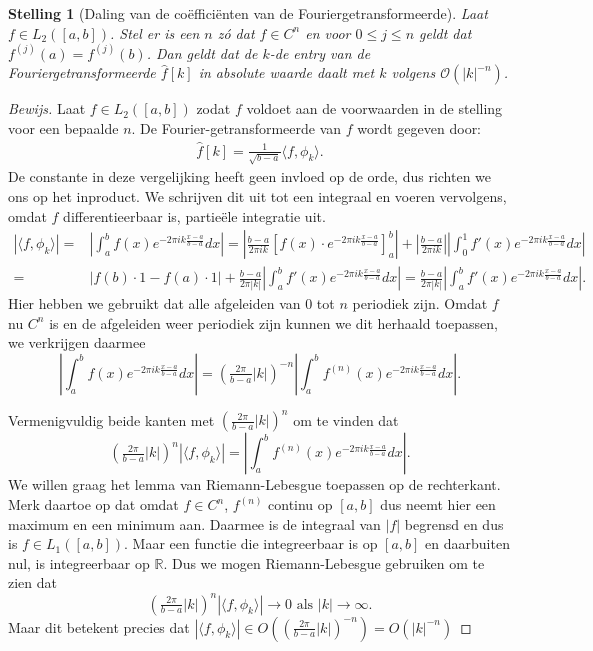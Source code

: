 \documentclass[11pt]{report}
\newcommand{\R}{\mathbb{R}}
\renewcommand{\O}{\mathcal{O}}
\theoremstyle{plain}
\newtheorem*{stelling}{Stelling}
\theoremstyle{remark}
\newcommand{\eq}[1]{\begin{eqnarray*} #1 \end{eqnarray*}}
\newcommand{\inpr}[2]{\langle #1 , #2 \rangle}
\newcommand{\abso}[1]{{\left| #1 \right|}}
\begin{document}
\begin{stelling}[Daling van de co\"effici\"enten van de Fouriergetransformeerde]
  Laat $f \in L_2([a,b])$. Stel er is een $n$ z\'o dat $f \in C^n$ en voor $0\leq j\leq n$ geldt dat $f^{(j)}(a) = f^{(j)}(b)$. Dan geldt dat de $k$-de entry van de Fouriergetransformeerde $\hat f[k]$ in absolute waarde
  daalt met $k$ volgens $\O(|k|^{-n})$.
\end{stelling}
\begin{proof}[Bewijs]
  Laat $f \in L_2([a,b])$ zodat $f$ voldoet aan de voorwaarden in de stelling voor een bepaalde $n$. 
  De Fourier-getransformeerde van $f$ wordt gegeven door:
  \eq{
    \hat f [k] = \tfrac{1}{\sqrt{b-a}} \inpr{f}{\phi_k}.
  }
  De constante in deze vergelijking heeft geen invloed op de orde, dus richten we ons op het inproduct. 
  We schrijven dit uit tot een integraal en voeren vervolgens, omdat $f$ differentieerbaar is, partie\"ele
  integratie uit.
  \eq{
    \abso{\inpr{f}{\phi_k}} 
    =& \abso{\int_a^b f(x) e^{- 2 \pi i k \tfrac{x-a}{b-a}} dx}
    = \abso{\tfrac{b-a}{2 \pi i k}\left[ f(x) \cdot  e^{- 2 \pi i k \tfrac{x-a}{b-a}} \right]_a^b} 
    + \abso{\frac{b-a}{2 \pi i k}\right| \left|\int_0^1 f'(x) e^{-2 \pi i k \tfrac{x-a}{b-a}} dx} \\
    =& \abso{ f(b) \cdot 1 - f(a) \cdot 1} + \frac{b-a}{2 \pi \abso{k}} 
    \abso{ \int_a^b f'(x) e^{-2 \pi i k \tfrac{x-a}{b-a}} dx }
    = \tfrac{b-a}{2 \pi |k|} \left| \int_a^b f'(x) e^{-2 \pi i k \tfrac{x-a}{b-a}} dx \right|.
  }
  Hier hebben we gebruikt dat alle afgeleiden van $0$ tot $n$ periodiek zijn.
  Omdat $f$ nu $C^n$ is en de afgeleiden weer periodiek zijn kunnen we dit herhaald toepassen,
  we verkrijgen daarmee
  \[
  \left| \int_a^b f(x) e^{-2 \pi i k \tfrac{x-a}{b-a}} dx \right| 
  = (\tfrac{2 \pi}{b-a} |k|)^{-n}\left| \int_a^b f^{(n)}(x) e^{- 2 \pi i k \tfrac{x-a}{b-a}} dx \right|.
  \]
  
  Vermenigvuldig beide kanten met $(\tfrac{2 \pi}{b-a} |k|)^n$ om te vinden dat
  \[
  (\tfrac{2 \pi}{b-a} |k|)^n \abso{\inpr{f}{\phi_k}} 
  = \abso{\int_a^b f^{(n)}(x) e^{- 2 \pi i k \tfrac{x-a}{b-a}} dx}.
  \]
  We willen graag het lemma van Riemann-Lebesgue toepassen op de rechterkant. 
  Merk daartoe op dat omdat $f \in C^n$, $f^{(n)}$ continu op $[a,b]$ 
  dus neemt hier een maximum en een minimum aan. 
  Daarmee is de integraal van $|f|$ begrensd en dus is $f\in L_1([a,b])$. 
  Maar een functie die integreerbaar is op $[a,b]$ en daarbuiten nul, is integreerbaar op $\R$. 
  Dus we mogen Riemann-Lebesgue gebruiken om te zien dat
  \[
  (\tfrac{2 \pi}{b-a} |k|)^n \abso{\inpr{f}{\phi_k}} \to 0 \text{ als } |k| \to \infty.
  \]
  Maar dit betekent precies dat $\abso{\inpr{f}{\phi_k}} \in  O((\tfrac{2 \pi}{b-a} |k|)^{-n}) = O(|k|^{-n})$
\end{proof}
\end{document}
